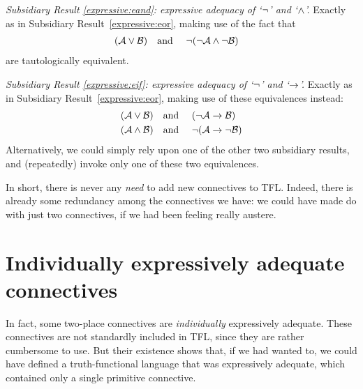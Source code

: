\emph{Subsidiary Result \ref{expressive:eand}: expressive adequacy of `$\neg$' and `$\wedge$'.} Exactly as in Subsidiary Result~\ref{expressive:eor}, making use of the fact that
		\begin{align*}
		(\mathcal{A} \vee \mathcal{B}) & \text{\quad and \quad}\neg(\neg \mathcal{A} \wedge\neg \mathcal{B})
		\end{align*}
are tautologically equivalent.

\emph{Subsidiary Result \ref{expressive:eif}: expressive adequacy of `$\neg$' and `$\rightarrow$'.} Exactly as in Subsidiary Result~\ref{expressive:eor}, making use of these equivalences instead:
		\begin{align*}
		(\mathcal{A} \vee \mathcal{B}) &\text{\quad and \quad} (\neg \mathcal{A} \rightarrow \mathcal{B})\\
		(\mathcal{A} \wedge \mathcal{B}) &\text{\quad and \quad} \neg(\mathcal{A} \rightarrow \neg\mathcal{B})
		\end{align*}
Alternatively, we could simply rely upon one of the other two subsidiary results, and (repeatedly) invoke only one of these two equivalences.

In short, there is never any \emph{need} to add new connectives to TFL. Indeed, there is already some redundancy among the connectives we have: we could have made do with just two connectives, if we had been feeling really austere.

\section{Individually expressively adequate connectives}

In fact, some two-place connectives are \emph{individually} expressively adequate. These connectives are not standardly included in TFL, since they are rather cumbersome to use. But their existence shows that, if we had wanted to, we could have defined a truth-functional language that was expressively adequate, which contained only a single primitive connective.

